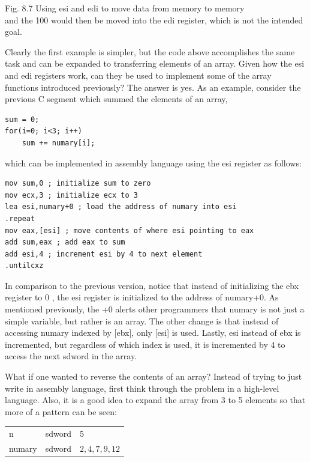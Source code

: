 \documentclass[10pt]{article}
\begin{document}
Fig. 8.7 Using esi and edi to move data from memory to memory\\
and the 100 would then be moved into the edi register, which is not the intended goal.

Clearly the first example is simpler, but the code above accomplishes the same task and can be expanded to transferring elements of an array. Given how the esi and edi registers work, can they be used to implement some of the array functions introduced previously? The answer is yes. As an example, consider the previous C segment which summed the elements of an array,

\begin{verbatim}
sum = 0;
for(i=0; i<3; i++)
    sum += numary[i];
\end{verbatim}

which can be implemented in assembly language using the esi register as follows:

\begin{verbatim}
mov sum,0 ; initialize sum to zero
mov ecx,3 ; initialize ecx to 3
lea esi,numary+0 ; load the address of numary into esi
.repeat
mov eax,[esi] ; move contents of where esi pointing to eax
add sum,eax ; add eax to sum
add esi,4 ; increment esi by 4 to next element
.untilcxz
\end{verbatim}

In comparison to the previous version, notice that instead of initializing the ebx register to 0 , the esi register is initialized to the address of numary+0. As mentioned previously, the +0 alerts other programmers that numary is not just a simple variable, but rather is an array. The other change is that instead of accessing numary indexed by [ebx], only [esi] is used. Lastly, esi instead of ebx is incremented, but regardless of which index is used, it is incremented by 4 to access the next sdword in the array.

What if one wanted to reverse the contents of an array? Instead of trying to just write in assembly language, first think through the problem in a high-level language. Also, it is a good idea to expand the array from 3 to 5 elements so that more of a pattern can be seen:

\begin{center}
\begin{tabular}{lll}
n & sdword & 5 \\
numary & sdword & $2,4,7,9,12$ \\
\end{tabular}
\end{center}
\end{document}
